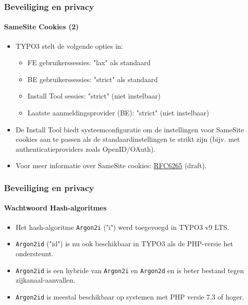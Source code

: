 
\begin{frame}[fragile]
	\frametitle{Beveiliging en privacy}
	\framesubtitle{SameSite Cookies (2)}

	\begin{itemize}
		\item TYPO3 stelt de volgende opties in:

			\begin{itemize}\small
				\item FE gebruikerssessies: "lax" als standaard
				\item BE gebruikerssessies: "strict" als standaard
				\item Install Tool sessies: "strict" (niet instelbaar)
				\item Laatste aanmeldingsprovider (BE): "strict" (niet instelbaar)
			\end{itemize}\normalsize

		\item De Install Tool biedt systeemconfiguratie om de instellingen voor
			SameSite cookies aan te passen als de standaardinstellingen te strikt zijn
			(bijv. met authenticatieproviders zoals OpenID/OAuth).

		\item Voor meer informatie over SameSite cookies:
			\href{https://tools.ietf.org/html/draft-ietf-httpbis-cookie-same-site-00}{RFC6265} (draft).
	\end{itemize}

\end{frame}


\begin{frame}[fragile]
	\frametitle{Beveiliging en privacy}
	\framesubtitle{Wachtwoord Hash-algoritmes}

	\begin{itemize}
		\item Het hash-algoritme \texttt{Argon2i} ("i") werd toegevoegd in TYPO3 v9 LTS.
		\item \texttt{Argon2id} ("id") is nu ook beschikbaar in TYPO3 als de PHP-versie het ondersteunt.
		\item \texttt{Argon2id} is een hybride van \texttt{Argon2i} en \texttt{Argon2d}
			en is beter bestand tegen zijkanaal-aanvallen.
		\item \texttt{Argon2id} is meestal beschikbaar op systemen met PHP versie 7.3 of hoger.
	\end{itemize}

\end{frame}

